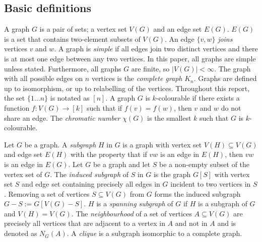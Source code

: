 
\subsection{Basic definitions}\label{sec: Basic definitions}
A graph $G$ is a pair of sets; a vertex set $V(G)$ and an edge set $E(G)$. $E(G)$ is a set that contains two-element subsets of $V(G)$. An edge $ \{v, w\}$ \textit{joins} vertices $v$ and $w$. A graph is \textit{simple} if all edges join two distinct vertices and there is at most one edge between any two vertices. In this paper, all graphs are simple unless stated. Furthermore, all graphs $G$ are finite, so $|V(G)| < \infty$. The graph with all possible edges on $n$ vertices is the \textit{complete graph} $K_n$. Graphs are defined up to isomorphism, or up to relabelling of the vertices.
Throughout this report, the set $\lbrace 1\ldots n \rbrace$ is notated as $[n]$. 
A graph \(G\) is \(k\)-colourable if there exists a function \(f: V(G) \rightarrow [k]\) such that if $f(v) = f(w)$, then $v$ and $w$ do not share an edge. The \textit{chromatic number} \(\chi(G)\) is the smallest \(k\) such that \(G\) is \(k\)-colourable. 

Let $G$ be a graph. A \textit{subgraph} $H$ in $G$ is a graph with vertex set $V(H) \subseteq V(G)$ and edge set $E(H)$ with the property that if $vw$ is an edge in $E(H)$, then $vw$ is an edge in $E(G)$.
Let $G$ be a graph and let $S$ be a non-empty subset of the vertex set of $G$. The \textit{induced subgraph} of $S$ in $G$ is the graph $G[S]$ with vertex set $S$ and edge set containing precisely all edges in $G$ incident to two vertices in $S$. Removing a set of vertices $S \subseteq V(G)$ from $G$ forms the induced subgraph $G - S := G[V(G) - S]$. 
$H$ is a \textit{spanning subgraph} of $G$ if $H$ is a subgraph of $G$ and $V(H) = V(G)$. 
The \textit{neighbourhood} of a set of vertices $A \subseteq V(G)$ are precisely all vertices that are adjacent to a vertex in $A$ and not in $A$ and is denoted as $N_G(A)$. A \textit{clique} is a subgraph isomorphic to a complete graph. 